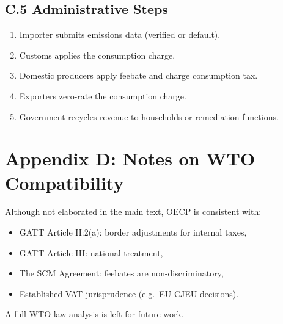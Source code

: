 \documentclass[12pt]{article}
\begin{document}
\subsection{C.5 Administrative Steps}

\begin{enumerate}
    \item Importer submits emissions data (verified or default).
    \item Customs applies the consumption charge.
    \item Domestic producers apply feebate and charge consumption tax.
    \item Exporters zero-rate the consumption charge.
    \item Government recycles revenue to households or remediation functions.
\end{enumerate}

\section{Appendix D: Notes on WTO Compatibility}

Although not elaborated in the main text, OECP is consistent with:
\begin{itemize}
    \item GATT Article II:2(a): border adjustments for internal taxes,
    \item GATT Article III: national treatment,
    \item The SCM Agreement: feebates are non-discriminatory,
    \item Established VAT jurisprudence (e.g.\ EU CJEU decisions).
\end{itemize}

A full WTO-law analysis is left for future work.

\end{document}
